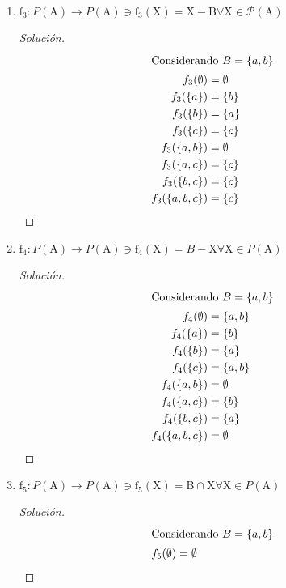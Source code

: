 \documentclass[a4paper,12pt]{article}
\newenvironment{solution}
  {\renewcommand\qedsymbol{$\blacksquare$}\begin{proof}[Solución]}
  {\end{proof}}
\begin{document}
\begin{enumerate}
\begin{solution}
\begin{align}
    f_2(\{b, c\}) &=\{a,b,c\} \\
    f_2(\{a, b, c\}) &=\{a,b,c\}
\end{align}
\end{solution}
\item  $\mathrm{f}_{3}:P(\mathrm{A}) \rightarrow P(\mathrm{A}) \ni \mathrm{f}_{3}(\mathrm{X})=\mathrm{X}-\mathrm{B}\forall \mathrm{X} \in \mathcal{P}(\mathrm{A})$
\begin{solution}
\begin{align}
\intertext{Considerando $B=\{a,b\}$}
    f_3(\emptyset) &= \emptyset \\
    f_3(\{a\}) &=\{b\} \\
    f_3(\{b\}) &= \{a\} \\
    f_3(\{c\}) &=\{c\} \\
    f_3(\{a, b\}) &= \emptyset \\
    f_3(\{a, c\}) &= \{c\} \\
    f_3(\{b, c\}) &= \{c\}\\
    f_3(\{a, b, c\}) &= \{c\}
\end{align}
\end{solution}
\item  $\mathrm{f}_{4}: P(\mathrm{A}) \rightarrow P(\mathrm{A}) \ni \mathrm{f}_{4}(\mathrm{X})=B-\mathrm{X}\forall \mathrm{X} \in P(\mathrm{A})$
\begin{solution}
\begin{align}
\intertext{Considerando $B=\{a,b\}$}
    f_4(\emptyset) &= \{a,b\} \\
    f_4(\{a\}) &= \{b\}\\
    f_4(\{b\}) &= \{a\}\\
    f_4(\{c\}) &= \{a,b\}\\
    f_4(\{a, b\}) &= \emptyset\\
    f_4(\{a, c\}) &= \{b\}\\
    f_4(\{b, c\}) &= \{a\}\\
    f_4(\{a, b, c\}) &= \emptyset\\
\end{align}
\end{solution}
\item  $ \mathrm{f}_{5}: P(\mathrm{A}) \rightarrow P(\mathrm{A}) \ni \mathrm{f}_{5}(\mathrm{X})=\mathrm{B} \cap \mathrm{X}\forall\mathrm{X} \in P(\mathrm{A})
$
\begin{solution}
\begin{align}
\intertext{Considerando $B=\{a,b\}$}
    f_5(\emptyset) &=\emptyset\\ 

\end{align}
\end{solution}
\end{enumerate}
\end{document}
